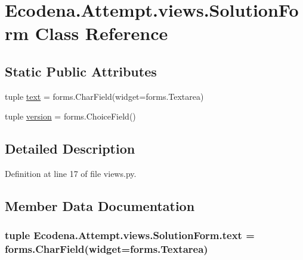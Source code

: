 \hypertarget{class_ecodena_1_1_attempt_1_1views_1_1_solution_form}{
\section{Ecodena.Attempt.views.SolutionForm Class Reference}
\label{df/d81/class_ecodena_1_1_attempt_1_1views_1_1_solution_form}
}
\subsection*{Static Public Attributes}
\begin{DoxyCompactItemize}
\item 
tuple \hyperlink{class_ecodena_1_1_attempt_1_1views_1_1_solution_form_a468dd4b8939f889b625d93015bbb2e4f}{text} = forms.CharField(widget=forms.Textarea)
\item 
tuple \hyperlink{class_ecodena_1_1_attempt_1_1views_1_1_solution_form_a77e5671273cfb3207fd55e2b3defd321}{version} = forms.ChoiceField()
\end{DoxyCompactItemize}


\subsection{Detailed Description}


Definition at line 17 of file views.py.



\subsection{Member Data Documentation}
\hypertarget{class_ecodena_1_1_attempt_1_1views_1_1_solution_form_a468dd4b8939f889b625d93015bbb2e4f}{
\subsubsection[{text}]{\setlength{\rightskip}{0pt plus 5cm}tuple {\bf Ecodena.Attempt.views.SolutionForm.text} = forms.CharField(widget=forms.Textarea)}}
\label{df/d81/class_ecodena_1_1_attempt_1_1views_1_1_solution_form_a468dd4b8939f889b625d93015bbb2e4f}


